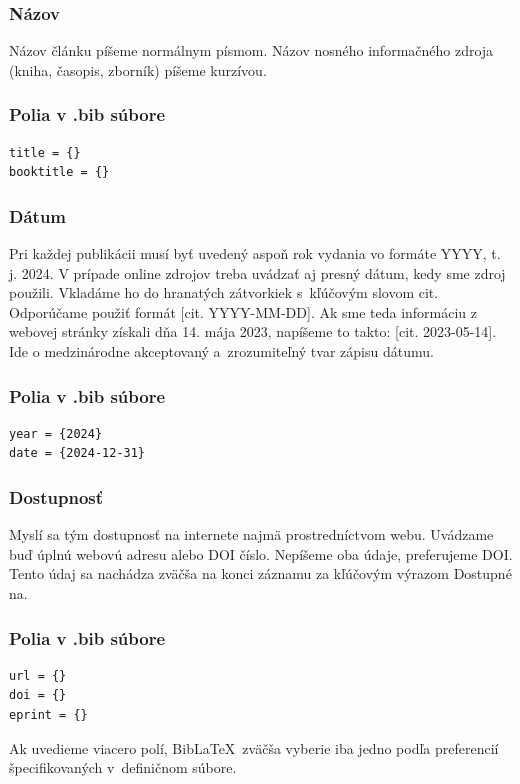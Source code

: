 \documentclass[../../../thesis.tex]{subfiles}
\begin{document}
\subsubsection*{Názov}
Názov článku píšeme normálnym písmom.
Názov nosného informačného zdroja (kniha, časopis, zborník) píšeme kurzívou.

\subsubsection*{\normalsize Polia v .bib súbore}
\begin{verbatim}
title = {}
booktitle = {}
\end{verbatim}

\subsubsection*{Dátum}
Pri každej publikácii musí byť uvedený aspoň rok vydania
vo formáte YYYY, t. j. 2024.
V prípade online zdrojov treba uvádzať aj presný dátum,
kedy sme zdroj použili.
Vkladáme ho do hranatých zátvorkiek s~kľúčovým slovom cit.
Odporúčame použiť formát [cit. YYYY-MM-DD].
Ak sme teda informáciu z webovej stránky získali dňa
14. mája 2023,
napíšeme to takto: [cit. 2023-05-14].
Ide o medzinárodne akceptovaný a~zrozumiteľný tvar zápisu dátumu.

\subsubsection*{\normalsize Polia v .bib súbore}
\begin{verbatim}
year = {2024}
date = {2024-12-31}
\end{verbatim}

\subsubsection*{Dostupnosť}
Myslí sa tým dostupnosť na internete najmä prostredníctvom webu.
Uvádzame buď úplnú webovú adresu alebo DOI číslo.
Nepíšeme oba údaje, preferujeme DOI.
Tento údaj sa nachádza zväčša na konci záznamu za kľúčovým výrazom Dostupné na.

\subsubsection*{\normalsize Polia v .bib súbore}
\begin{verbatim}
url = {}
doi = {}
eprint = {}
\end{verbatim}
Ak uvedieme viacero polí, Bib\LaTeX\ zväčša vyberie iba jedno
podľa preferencií špecifikovaných v~definičnom súbore.
\end{document}
